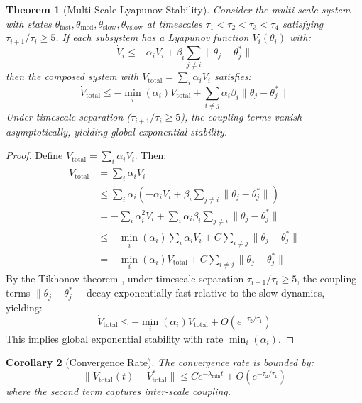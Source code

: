 \documentclass[12pt,a4paper,twocolumn]{article}
\newtheorem{theorem}{Theorem}[section]
\newtheorem{corollary}[theorem]{Corollary}
\begin{document}
\begin{theorem}[Multi-Scale Lyapunov Stability]
\label{thm:multiscale}
Consider the multi-scale system with states $\theta_{\text{fast}}, \theta_{\text{med}}, \theta_{\text{slow}}, \theta_{\text{vslow}}$ at timescales $\tau_1 < \tau_2 < \tau_3 < \tau_4$ satisfying $\tau_{i+1}/\tau_i \geq 5$. If each subsystem has a Lyapunov function $V_i(\theta_i)$ with:
\begin{equation}
    \dot{V}_i \leq -\alpha_i V_i + \beta_i \sum_{j \neq i} \|\theta_j - \theta_j^*\|
\end{equation}
then the composed system with $V_{\text{total}} = \sum_i \alpha_i V_i$ satisfies:
\begin{equation}
    \dot{V}_{\text{total}} \leq -\min_i(\alpha_i) V_{\text{total}} + \sum_{i \neq j} \alpha_i \beta_i \|\theta_j - \theta_j^*\|
\end{equation}
Under timescale separation ($\tau_{i+1}/\tau_i \geq 5$), the coupling terms vanish asymptotically, yielding global exponential stability.
\end{theorem}

\begin{proof}
Define $V_{\text{total}} = \sum_i \alpha_i V_i$. Then:
\begin{align}
    \dot{V}_{\text{total}} &= \sum_i \alpha_i \dot{V}_i \\
    &\leq \sum_i \alpha_i \left(-\alpha_i V_i + \beta_i \sum_{j \neq i} \|\theta_j - \theta_j^*\|\right) \\
    &= -\sum_i \alpha_i^2 V_i + \sum_i \alpha_i \beta_i \sum_{j \neq i} \|\theta_j - \theta_j^*\| \\
    &\leq -\min_i(\alpha_i) \sum_i \alpha_i V_i + C\sum_{i \neq j} \|\theta_j - \theta_j^*\| \\
    &= -\min_i(\alpha_i) V_{\text{total}} + C\sum_{i \neq j} \|\theta_j - \theta_j^*\|
\end{align}
By the Tikhonov theorem \citep{Khalil2002}, under timescale separation $\tau_{i+1}/\tau_i \geq 5$, the coupling terms $\|\theta_j - \theta_j^*\|$ decay exponentially fast relative to the slow dynamics, yielding:
\begin{equation}
    \dot{V}_{\text{total}} \leq -\min_i(\alpha_i) V_{\text{total}} + O(e^{-\tau_2/\tau_1})
\end{equation}
This implies global exponential stability with rate $\min_i(\alpha_i)$.
\end{proof}

\begin{corollary}[Convergence Rate]
\label{cor:convergence}
The convergence rate is bounded by:
\begin{equation}
    \|V_{\text{total}}(t) - V^*_{\text{total}}\| \leq C e^{-\lambda_{\min} t} + O(e^{-\tau_2/\tau_1})
\end{equation}
where the second term captures inter-scale coupling.
\end{corollary}
\end{document}
